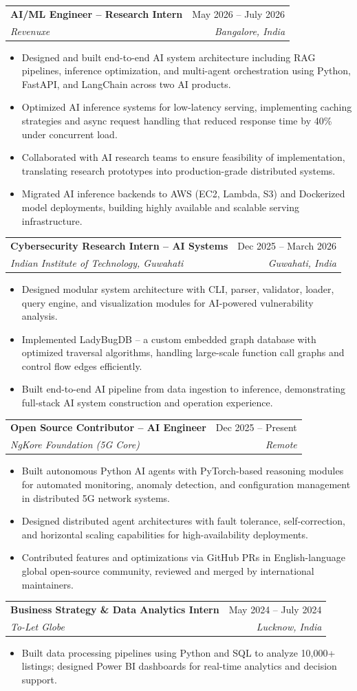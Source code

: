 \documentclass[letterpaper,11pt]{article}
\makeatletter
\newcommand{\resumeItem}[1]{
  \item\small{#1}
}
\newcommand{\resumeSubheading}[4]{
  \vspace{-2pt}\item
    \begin{tabular*}{0.97\textwidth}[t]{l@{\extracolsep{\fill}}r}
      \textbf{#1} & #2 \\
      \textit{\small#3} & \textit{\small #4} \\
    \end{tabular*}\vspace{-7pt}
}
\newcommand{\resumeItemListStart}{\begin{itemize}}
\newcommand{\resumeItemListEnd}{\end{itemize}\vspace{-5pt}}
\makeatother
\begin{document}
    \resumeSubheading
      {AI/ML Engineer -- Research Intern}{May 2026 -- July 2026}
      {Revenuxe}{Bangalore, India}
      \resumeItemListStart
        \resumeItem{Designed and built end-to-end AI system architecture including RAG pipelines, inference optimization, and multi-agent orchestration using Python, FastAPI, and LangChain across two AI products.}
        \resumeItem{Optimized AI inference systems for low-latency serving, implementing caching strategies and async request handling that reduced response time by 40\% under concurrent load.}
        \resumeItem{Collaborated with AI research teams to ensure feasibility of implementation, translating research prototypes into production-grade distributed systems.}
        \resumeItem{Migrated AI inference backends to AWS (EC2, Lambda, S3) and Dockerized model deployments, building highly available and scalable serving infrastructure.}
      \resumeItemListEnd

    \resumeSubheading
      {Cybersecurity Research Intern -- AI Systems}{Dec 2025 -- March 2026}
      {Indian Institute of Technology, Guwahati}{Guwahati, India}
      \resumeItemListStart
        \resumeItem{Designed modular system architecture with CLI, parser, validator, loader, query engine, and visualization modules for AI-powered vulnerability analysis.}
        \resumeItem{Implemented LadyBugDB -- a custom embedded graph database with optimized traversal algorithms, handling large-scale function call graphs and control flow edges efficiently.}
        \resumeItem{Built end-to-end AI pipeline from data ingestion to inference, demonstrating full-stack AI system construction and operation experience.}
      \resumeItemListEnd

    \resumeSubheading
      {Open Source Contributor -- AI Engineer}{Dec 2025 -- Present}
      {NgKore Foundation (5G Core)}{Remote}
      \resumeItemListStart
        \resumeItem{Built autonomous Python AI agents with PyTorch-based reasoning modules for automated monitoring, anomaly detection, and configuration management in distributed 5G network systems.}
        \resumeItem{Designed distributed agent architectures with fault tolerance, self-correction, and horizontal scaling capabilities for high-availability deployments.}
        \resumeItem{Contributed features and optimizations via GitHub PRs in English-language global open-source community, reviewed and merged by international maintainers.}
      \resumeItemListEnd

    \resumeSubheading
      {Business Strategy \& Data Analytics Intern}{May 2024 -- July 2024}
      {To-Let Globe}{Lucknow, India}
      \resumeItemListStart
        \resumeItem{Built data processing pipelines using Python and SQL to analyze 10,000+ listings; designed Power BI dashboards for real-time analytics and decision support.}
      \resumeItemListEnd
\end{document}
